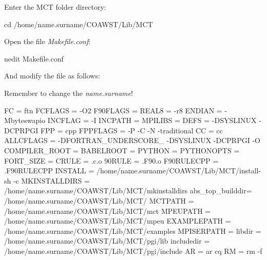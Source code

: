 \noindent Enter the MCT folder directory:
\bigskip

\begin{bashcode}
cd /home/name.surname/COAWST/Lib/MCT
\end{bashcode}
\bigskip

\noindent Open the file \textit{Makefile.conf}:
\bigskip


\begin{bashcode}
nedit Makefile.conf
\end{bashcode}
\bigskip

\noindent And modify the file as follows:
\bigskip

\begin{tcolorbox}[enhanced,
  grow to left by=0cm,%
  grow to right by=0cm,%
  enlarge top by=0cm,%
  enlarge bottom by=0cm,%
  tcbox raise base,
  boxrule=1.0pt,
  left=18mm,
  colframe=red!50!black,coltext=red!25!black,colback=red!10!white,
  overlay={\begin{tcbclipinterior}\fill[red!75!blue!50!white] (frame.south west)
    rectangle node[text=white,font=\sffamily\bfseries\footnotesize,rotate=0] {WARNING} ([xshift=18mm]frame.north west);\end{tcbclipinterior}}]
    Remember to change the \textit{name.surname}!
\end{tcolorbox}
\bigskip

\begin{bashcode}
FC  	    = ftn
FCFLAGS	 = -O2
F90FLAGS        = 
REAL8           = -r8
ENDIAN          = -Mbyteswapio
INCFLAG         = -I
INCPATH         =
MPILIBS         = 
DEFS            = -DSYSLINUX -DCPRPGI
FPP	     = cpp
FPPFLAGS        = -P -C -N -traditional
CC              = cc
ALLCFLAGS       = -DFORTRAN_UNDERSCORE_ -DSYSLINUX -DCPRPGI -O
COMPILER_ROOT   = 
BABELROOT       = 
PYTHON          = 
PYTHONOPTS      = 
FORT_SIZE       = 
CRULE           = .c.o
90RULE          = .F90.o
F90RULECPP      = .F90RULECPP
INSTALL         = /home/name.surname/COAWST/Lib/MCT/install-sh -c
MKINSTALLDIRS   = /home/name.surname/COAWST/Lib/MCT/mkinstalldirs
abs_top_builddir= /home/name.surname/COAWST/Lib/MCT/
MCTPATH         = /home/name.surname/COAWST/Lib/MCT/mct
MPEUPATH        = /home/name.surname/COAWST/Lib/MCT/mpeu
EXAMPLEPATH     = /home/name.surname/COAWST/Lib/MCT/examples
MPISERPATH      = 
libdir          = /home/name.surname/COAWST/Lib/MCT/pgi/lib
includedir      = /home/name.surname/COAWST/Lib/MCT/pgi/include
AR	      = ar cq
RM	      = rm -f
\end{bashcode}
\bigskip

